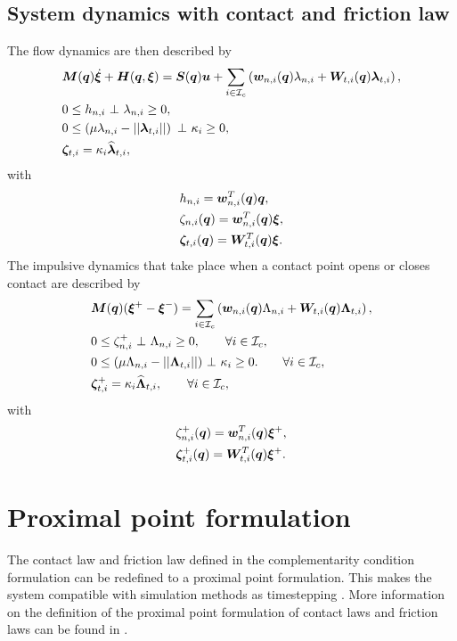 \documentclass[../DC2017114Bouma.tex]{subfiles}
\begin{document}
\subsection{System dynamics with contact and friction law}
The flow dynamics are then described by
\begin{align}
&\Mb(\qb)\dot{\xib} + \Hb(\qb,\xib) = \Sb(\qb)\ub + \sum_{i\in\Ic_c}\left(\wb_{n,i}(\qb)\lambda_{n,i} + \Wb_{t,i}(\qb)\lambdab_{t,i} \right), \label{eq:ncpcontact1}\\
&0\leq h_{n,i}\ \bot\ \lambda_{n,i} \geq 0,\label{eq:ncpcontact2}\\
&0\leq \left(\mu\lambda_{n,i} - ||\lambdab_{t,i}||\right)\ \bot\ \kappa_i \geq 0,\label{eq:ncpcontact3}\\
&\zetab_{t,i} = \kappa_i\widehat{\lambdab}_{t,i},\label{eq:ncpcontact4}
\end{align}
with 
\begin{align}
&h_{n,i} = {\boldsymbol{w}}_{n,i}^T({\boldsymbol{q}}){\boldsymbol{q}},\label{eq:h}\\
&\zeta_{n,i}({\boldsymbol{q}}) = {\boldsymbol{w}}^T_{n,i}({\boldsymbol{q}}) \boldsymbol{\xi},  \label{eq:zetan}\\
&\boldsymbol{\zeta}_{t,i}({\boldsymbol{q}}) = {\boldsymbol{W}}^T_{t,i}({\boldsymbol{q}}) \boldsymbol{\xi}. \label{eq:zetab}
\end{align}
The impulsive dynamics that take place when a contact point opens or closes contact are described by
\begin{align}
&{\boldsymbol{M}}({\boldsymbol{q}})(\boldsymbol{\xi}^+ - \boldsymbol{\xi}^-) = \sum_{i\in\mathcal{I}_c}\left( {\boldsymbol{w}}_{n,i}({\boldsymbol{q}})\Lambda_{n,i} + {\boldsymbol{W}}_{t,i}({\boldsymbol{q}})\boldsymbol{\Lambda}_{t,i}\right), \label{eq:ncpimpact1}\\
&0\leq \zeta_{n,i}^+\ \bot\ \Lambda_{n,i} \geq 0, \qquad \forall i\in\mathcal{I}_c,\label{eq:ncpimpact2}\\
&0 \leq (\mu\Lambda_{n,i} - ||\boldsymbol{\Lambda}_{t,i}||)\ \bot\ \kappa_i \geq 0. \qquad \forall i\in\mathcal{I}_c,\label{eq:ncpimpact3}\\
&\boldsymbol{\zeta}_{t,i}^+ = \kappa_i\widehat{\boldsymbol{\Lambda}}_{t,i},\qquad \forall i\in\mathcal{I}_c,\label{eq:ncpimpact4}
\end{align}
with 
\begin{align}
&\zeta^+_{n,i}({\boldsymbol{q}}) = {\boldsymbol{w}}^T_{n,i}({\boldsymbol{q}}) \boldsymbol{\xi}^+,\\
&\boldsymbol{\zeta}^+_{t,i}({\boldsymbol{q}}) = {\boldsymbol{W}}^T_{t,i}({\boldsymbol{q}}) \boldsymbol{\xi}^+.\label{eq:ncpimpactend}
\end{align}

\section{Proximal point formulation}
The contact law and friction law defined in the complementarity condition formulation can be redefined to a proximal point formulation. This makes the system compatible with simulation methods as timestepping \cite[Chapter 10]{Acary2008}. More information on the definition of the proximal point formulation of contact laws and friction laws can be found in \cite[Section 5.3]{Leine2008}.
\end{document}
